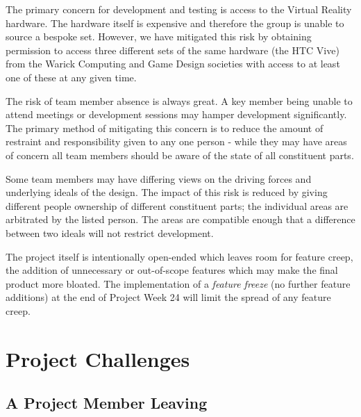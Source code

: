     \begin{description}[style=nextline]
            \item[\textbf{VR headset access}]
                The primary concern for development and testing is access to the Virtual Reality hardware. The hardware itself is expensive and therefore the group is unable to source a bespoke set. However, we have mitigated this risk by obtaining permission to access three different sets of the same hardware (the HTC Vive) from the Warick Computing and Game Design societies with access to at least one of these at any given time.
            \item[\textbf{Illness and absence}]
                The risk of team member absence is always great. A key member being unable to attend meetings or development sessions may hamper development significantly. The primary method of mitigating this concern is to reduce the amount of restraint and responsibility given to any one person - while they may have areas of concern all team members should be aware of the state of all constituent parts.
            \item[\textbf{Conflict of Interest}]
                Some team members may have differing views on the driving forces and underlying ideals of the design. The impact of this risk is reduced by giving different people ownership of different constituent parts; the individual areas are arbitrated by the listed person. The areas are compatible enough that a difference between two ideals will not restrict development.
            \item[\textbf{Feature creep}]
                The project itself is intentionally open-ended which leaves room for feature creep, the addition of unnecessary or out-of-scope features which may make the final product more bloated. The implementation of a \emph{feature freeze} (no further feature additions) at the end of Project Week 24 will limit the spread of any feature creep.
        \end{description}

\section{Project Challenges}

    \subsection{A Project Member Leaving}
    
